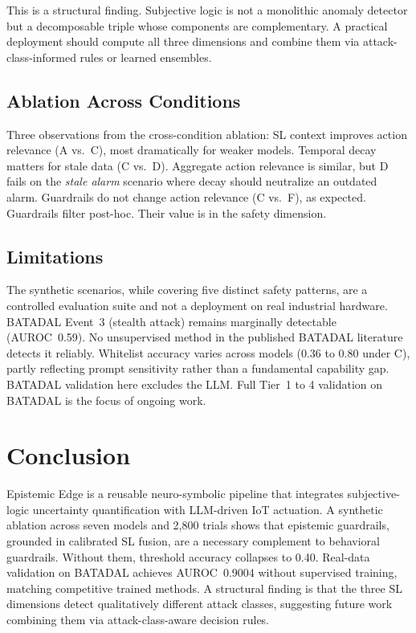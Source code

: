 \documentclass[conference]{IEEEtran}
\begin{document}
This is a structural finding. Subjective logic is not a monolithic anomaly detector but a decomposable triple whose components are complementary. A practical deployment should compute all three dimensions and combine them via attack-class-informed rules or learned ensembles.

\subsection{Ablation Across Conditions}

Three observations from the cross-condition ablation:
SL context improves action relevance (A vs.\ C), most dramatically for weaker models.
Temporal decay matters for stale data (C vs.\ D). Aggregate action relevance is similar, but D fails on the \textit{stale alarm} scenario where decay should neutralize an outdated alarm.
Guardrails do not change action relevance (C vs.\ F), as expected. Guardrails filter post-hoc. Their value is in the safety dimension.

\subsection{Limitations}

The synthetic scenarios, while covering five distinct safety patterns, are a controlled evaluation suite and not a deployment on real industrial hardware.
BATADAL Event~3 (stealth attack) remains marginally detectable (AUROC~0.59). No unsupervised method in the published BATADAL literature detects it reliably.
Whitelist accuracy varies across models (0.36 to 0.80 under C), partly reflecting prompt sensitivity rather than a fundamental capability gap.
BATADAL validation here excludes the LLM. Full Tier~1 to 4 validation on BATADAL is the focus of ongoing work.

\section{Conclusion}

Epistemic Edge is a reusable neuro-symbolic pipeline that integrates subjective-logic uncertainty quantification with LLM-driven IoT actuation. A synthetic ablation across seven models and 2{,}800 trials shows that epistemic guardrails, grounded in calibrated SL fusion, are a necessary complement to behavioral guardrails. Without them, threshold accuracy collapses to 0.40. Real-data validation on BATADAL achieves AUROC~0.9004 without supervised training, matching competitive trained methods. A structural finding is that the three SL dimensions detect qualitatively different attack classes, suggesting future work combining them via attack-class-aware decision rules.
\end{document}
